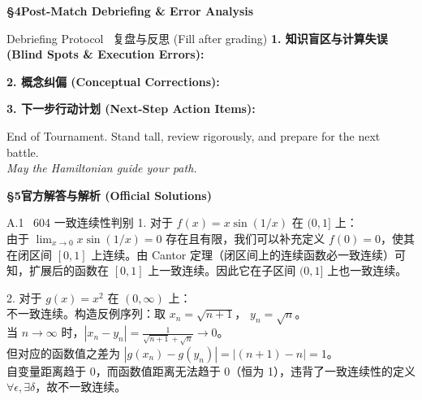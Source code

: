 \documentclass[a4paper,11pt]{article}
\begin{document}
\clearpage

{\Large\sffamily\bfseries\color{navy} \S 4\quad Post-Match Debriefing \& Error Analysis}

\vspace{4pt}

\begin{debrief}{Debriefing Protocol \textbar\ 复盘与反思 (Fill after grading)}
\textbf{1. 知识盲区与计算失误 (Blind Spots \& Execution Errors):}
\vspace{3.5cm}

\textbf{2. 概念纠偏 (Conceptual Corrections):}
\vspace{3.5cm}

\textbf{3. 下一步行动计划 (Next-Step Action Items):}
\vspace{3.5cm}
\end{debrief}

\vspace{4pt}
\begin{center}
\sffamily\color{mist}\small
End of Tournament. Stand tall, review rigorously, and prepare for the next battle.\\
\textit{May the Hamiltonian guide your path.}
\end{center}



\clearpage
{\Large\sffamily\bfseries\color{navy} \S 5\quad 官方解答与解析 (Official Solutions)}
\vspace{6pt}

\begin{solution}{A.1 \textbar\ 604 一致连续性判别}
1. 对于 $f(x) = x \sin(1/x)$ 在 $(0, 1]$ 上：\\
由于 $\lim_{x \to 0} x \sin(1/x) = 0$ 存在且有限，我们可以补充定义 $f(0)=0$，使其在闭区间 $[0,1]$ 上连续。由 Cantor 定理（闭区间上的连续函数必一致连续）可知，扩展后的函数在 $[0,1]$ 上一致连续。因此它在子区间 $(0,1]$ 上也一致连续。

2. 对于 $g(x) = x^2$ 在 $(0, \infty)$ 上：\\
不一致连续。构造反例序列：取 $x_n = \sqrt{n+1}$， $y_n = \sqrt{n}$。\\
当 $n \to \infty$ 时，$|x_n - y_n| = \frac{1}{\sqrt{n+1}+\sqrt{n}} \to 0$。\\
但对应的函数值之差为 $|g(x_n) - g(y_n)| = |(n+1) - n| = 1$。\\
自变量距离趋于 0，而函数值距离无法趋于 0（恒为 1），违背了一致连续性的定义 $\forall \epsilon, \exists \delta$，故不一致连续。
\end{solution}
\end{document}
